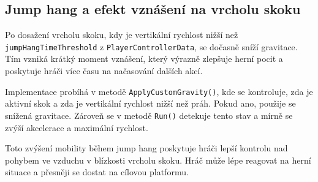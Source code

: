 \subsection{Jump hang a efekt vznášení na vrcholu skoku}

Po dosažení vrcholu skoku, kdy je vertikální rychlost nižší než \texttt{jumpHangTimeThreshold} z \texttt{PlayerControllerData}, se dočasně sníží gravitace. Tím vzniká krátký moment vznášení, který výrazně zlepšuje herní pocit a poskytuje hráči více času na načasování dalších akcí.

Implementace probíhá v metodě \texttt{ApplyCustomGravity()}, kde se kontroluje, zda je aktivní skok a zda je vertikální rychlost nižší než práh. Pokud ano, použije se snížená gravitace. Zároveň se v metodě \texttt{Run()} detekuje tento stav a mírně se zvýší akcelerace a maximální rychlost.

Toto zvýšení mobility během jump hang poskytuje hráči lepší kontrolu nad pohybem ve vzduchu v blízkosti vrcholu skoku. Hráč může lépe reagovat na herní situace a přesněji se dostat na cílovou platformu.